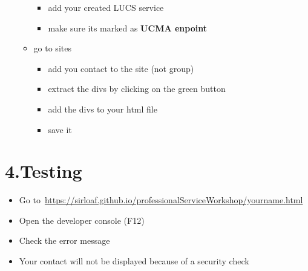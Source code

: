 \documentclass{article}
\begin{document}
\begin{itemize}[noitemsep,topsep=\mdcompacttopsep]
\begin{itemize}[noitemsep,topsep=\mdcompacttopsep]
\begin{itemize}[noitemsep,topsep=\mdcompacttopsep]
\item{}add your created LUCS service%

\item{}make sure its marked as \textbf{UCMA enpoint}%
\end{itemize}%

\item{}go to sites

\begin{itemize}[noitemsep,topsep=\mdcompacttopsep]%

\item{}add you contact to the site (not group)%

\item{}extract the divs by clicking on the green button%

\item{}add the divs to your html file%

\item{}save it%
\end{itemize}%
\end{itemize}%
\end{itemize}%

\section{4.\hspace*{0.5em}Testing}\label{sec-testing}%

\begin{itemize}[noitemsep,topsep=\mdcompacttopsep]%

\item{}Go to~\href{https://sirloaf.github.io/professionalServiceWorkshop/yourname.html}{https://sirloaf.github.io/professionalServiceWorkshop/yourname.html}%

\item{}Open the developer console (F12)%

\item{}Check the error message%

\item{}Your contact will not be displayed because of a security check%
\end{itemize}%
\end{document}
